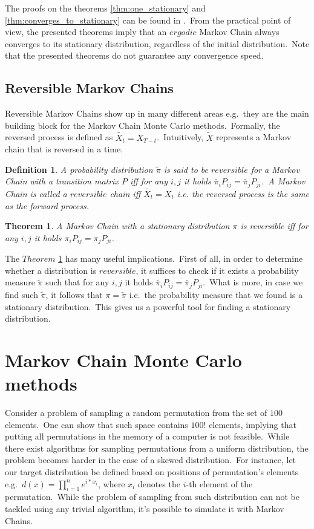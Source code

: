 \documentclass[a4paper, 11pt, onecolumn, openany, titlepage]{report}
\newcommand\numberedchapter[1]{\setlength\topskip{3cm}\chapter{#1}\setlength\topskip{0cm}}
\theoremstyle{default_theorem_style}\newtheorem{theorem}{Theorem}
\theoremstyle{default_theorem_style}\newtheorem{definition}{Definition}
\begin{document}
The proofs on the theorems \ref{thm:one_stationary} and \ref{thm:converges_to_stationary} can be found in
\cite{markov_chains_book}.\ From the practical point of view, the presented theorems imply that an $ergodic$ Markov
Chain always converges to its stationary distribution, regardless of the initial distribution.\ Note that the
presented theorems do not guarantee any convergence speed.

\section{Reversible Markov Chains}

Reversible Markov Chains show up in many different areas e.g.\ they are the main building block for the Markov
Chain Monte Carlo methods.\ Formally, the reversed process is defined as $\tilde{X_t} = X_{T - t}$.\ Intuitively,
$\tilde{X}$ represents a Markov chain that is reversed in a time.

\begin{definition}
A probability distribution $\tilde{\pi}$ is said to be $reversible$ for a Markov Chain with a transition matrix $P$
iff for any $i,j$ it holds $\tilde{\pi_i} P_{ij} = \tilde{\pi_j} P_{ji}$.\ A Markov Chain is called a $reversible$
chain iff $\tilde{X_t} = X_t$ i.e. the reversed process is the same as the forward process.
\end{definition}

\begin{theorem}\label{reversible_chain}
A Markov Chain with a stationary distribution $\pi$ is reversible iff for any $i, j$ it holds
$\pi_i P_{ij} = \pi_j P_{ji}$.
\end{theorem}

The $Theorem$ \ref{reversible_chain} has many useful implications.\ First of all, in order to determine whether a
distribution is $reversible$, it suffices to check if it exists a probability measure $\tilde{\pi}$ such that
for any $i, j$ it holds $\tilde{\pi_i} P_{ij} = \tilde{\pi_j} P_{ji}$.\ What is more, in case we find such
$\tilde{\pi}$, it follows that $\pi = \tilde{\pi}$ i.e.\ the probability measure that we found is a stationary
distribution.\ This gives us a powerful tool for finding a stationary distribution.

\numberedchapter{Markov Chain Monte Carlo methods}

Consider a problem of sampling a random permutation from the set of $100$ elements.\ One can show that such space
contains $100!$ elements, implying that putting all permutations in the memory of a computer is not feasible.\ While
there exist algorithms for sampling permutations from a uniform distribution, the problem becomes harder in the case of
a skewed distribution.\ For instance, let our target distribution be defined based on positions of permutation's
elements e.g.\ $d(x) = \prod_{i = 1}^{n} e^{i * x_i}$, where $x_i$ denotes the $i$-th element of the permutation.\ While
the problem of sampling from such distribution can not be tackled using any trivial algorithm, it's possible to
simulate it with Markov Chains.\newline
\end{document}
